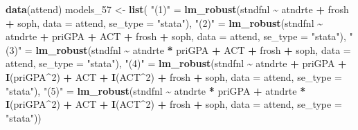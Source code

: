 \documentclass[
]{book}
\newenvironment{Shaded}{\begin{snugshade}}{\end{snugshade}}
\newcommand{\AttributeTok}[1]{\textcolor[rgb]{0.13,0.29,0.53}{#1}}
\newcommand{\DecValTok}[1]{\textcolor[rgb]{0.00,0.00,0.81}{#1}}
\newcommand{\FunctionTok}[1]{\textcolor[rgb]{0.13,0.29,0.53}{\textbf{#1}}}
\newcommand{\NormalTok}[1]{#1}
\newcommand{\OtherTok}[1]{\textcolor[rgb]{0.56,0.35,0.01}{#1}}
\newcommand{\SpecialCharTok}[1]{\textcolor[rgb]{0.81,0.36,0.00}{\textbf{#1}}}
\newcommand{\StringTok}[1]{\textcolor[rgb]{0.31,0.60,0.02}{#1}}
\begin{document}
\begin{Shaded}
\begin{Highlighting}[]
\FunctionTok{data}\NormalTok{(}\StringTok{\textquotesingle{}attend\textquotesingle{}}\NormalTok{)}
\NormalTok{models\_57 }\OtherTok{\textless{}{-}} \FunctionTok{list}\NormalTok{(}
    \StringTok{"(1)"} \OtherTok{=} \FunctionTok{lm\_robust}\NormalTok{(stndfnl }\SpecialCharTok{\textasciitilde{}}\NormalTok{ atndrte }\SpecialCharTok{+}\NormalTok{ frosh }\SpecialCharTok{+}\NormalTok{ soph, }\AttributeTok{data =}\NormalTok{ attend, }\AttributeTok{se\_type =} \StringTok{"stata"}\NormalTok{),}
    \StringTok{"(2)"} \OtherTok{=} \FunctionTok{lm\_robust}\NormalTok{(stndfnl }\SpecialCharTok{\textasciitilde{}}\NormalTok{ atndrte }\SpecialCharTok{+}\NormalTok{ priGPA }\SpecialCharTok{+}\NormalTok{ ACT }\SpecialCharTok{+}\NormalTok{ frosh }\SpecialCharTok{+}\NormalTok{ soph, }\AttributeTok{data =}\NormalTok{ attend, }\AttributeTok{se\_type =} \StringTok{"stata"}\NormalTok{),}
    \StringTok{"(3)"} \OtherTok{=} \FunctionTok{lm\_robust}\NormalTok{(stndfnl }\SpecialCharTok{\textasciitilde{}}\NormalTok{ atndrte }\SpecialCharTok{*}\NormalTok{ priGPA }\SpecialCharTok{+}\NormalTok{ ACT }\SpecialCharTok{+}\NormalTok{ frosh }\SpecialCharTok{+}\NormalTok{ soph, }\AttributeTok{data =}\NormalTok{ attend, }\AttributeTok{se\_type =} \StringTok{"stata"}\NormalTok{),}
    \StringTok{"(4)"} \OtherTok{=} \FunctionTok{lm\_robust}\NormalTok{(stndfnl }\SpecialCharTok{\textasciitilde{}}\NormalTok{ atndrte }\SpecialCharTok{+}\NormalTok{ priGPA }\SpecialCharTok{+} \FunctionTok{I}\NormalTok{(priGPA}\SpecialCharTok{\^{}}\DecValTok{2}\NormalTok{) }\SpecialCharTok{+}\NormalTok{ ACT }\SpecialCharTok{+} \FunctionTok{I}\NormalTok{(ACT}\SpecialCharTok{\^{}}\DecValTok{2}\NormalTok{) }\SpecialCharTok{+}\NormalTok{ frosh }\SpecialCharTok{+}\NormalTok{ soph, }\AttributeTok{data =}\NormalTok{ attend, }\AttributeTok{se\_type =} \StringTok{"stata"}\NormalTok{),}
    \StringTok{"(5)"} \OtherTok{=} \FunctionTok{lm\_robust}\NormalTok{(stndfnl }\SpecialCharTok{\textasciitilde{}}\NormalTok{ atndrte }\SpecialCharTok{*}\NormalTok{ priGPA }\SpecialCharTok{+}\NormalTok{ atndrte }\SpecialCharTok{*} \FunctionTok{I}\NormalTok{(priGPA}\SpecialCharTok{\^{}}\DecValTok{2}\NormalTok{) }\SpecialCharTok{+}\NormalTok{ ACT }\SpecialCharTok{+} \FunctionTok{I}\NormalTok{(ACT}\SpecialCharTok{\^{}}\DecValTok{2}\NormalTok{) }\SpecialCharTok{+}\NormalTok{ frosh }\SpecialCharTok{+}\NormalTok{ soph, }\AttributeTok{data =}\NormalTok{ attend, }\AttributeTok{se\_type =} \StringTok{"stata"}\NormalTok{))}


\end{Highlighting}
\end{Shaded}
\end{document}

